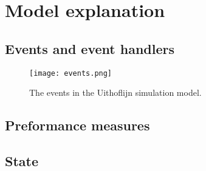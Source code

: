 \section{Model explanation}

\subsection{Events and event handlers}

\begin{figure}[h!]
    \centering
    \texttt{[image: events.png]}
    \caption{The events in the Uithoflijn simulation model.}
    \label{fig:events}
  \end{figure}


\subsection{Preformance measures}

\subsection{State}